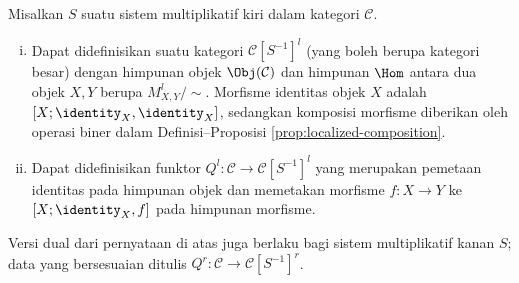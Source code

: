 \begin{definisiteorema}\label{def:fraction-localization}
	Misalkan $S$ suatu sistem multiplikatif kiri dalam kategori $\mathcal{C}$.
	\begin{enumerate}[(i)]
		\item Dapat didefinisikan suatu kategori
		$\mathcal{C}[S^{-1}]^l$ (yang boleh berupa kategori besar) dengan
		himpunan objek $\Obj(\mathcal{C})$ dan himpunan $\Hom$ antara dua objek
		$X,Y$ berupa $M_{X,Y}^l/\sim$. Morfisme identitas objek $X$ adalah
		$[X;\identity_X,\identity_X]$, sedangkan komposisi morfisme diberikan
		oleh operasi biner dalam Definisi--Proposisi
		\ref{prop:localized-composition}.
		\item Dapat didefinisikan funktor
		$Q^l: \mathcal{C} \to \mathcal{C}[S^{-1}]^l$ yang merupakan pemetaan
		identitas pada himpunan objek dan memetakan morfisme $f:X\to Y$ ke
		$[X;\identity_X,f]$ pada himpunan morfisme.
	\end{enumerate}
	Versi dual dari pernyataan di atas juga berlaku bagi sistem multiplikatif
	kanan $S$; data yang bersesuaian ditulis
	$Q^r: \mathcal{C} \to \mathcal{C}[S^{-1}]^r$.
\end{definisiteorema}
